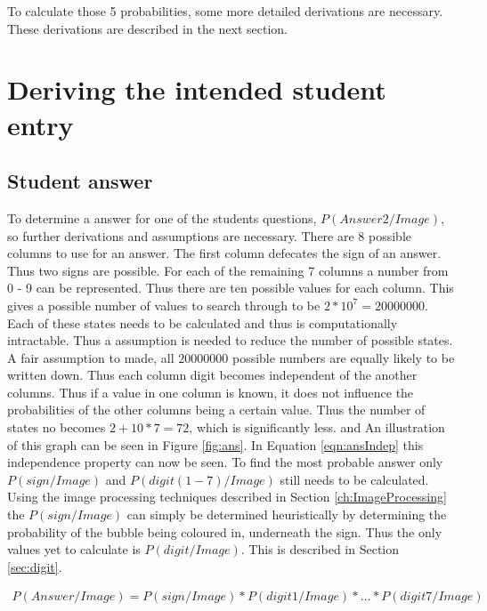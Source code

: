 To calculate those 5 probabilities, some more detailed derivations are necessary. These derivations are described in the next section.

\section{Deriving the intended student entry}

\subsection{Student answer}



To determine a answer for one of the students questions, $P(Answer2/Image)$, so further derivations and assumptions are necessary. There are 8 possible columns to use for an answer. The first column defecates the sign of an answer. Thus two signs are possible. For each of the remaining 7 columns a number from 0 - 9 can be represented. Thus there are ten possible values for each column. This gives a possible number of values to search through to be $2*10^7 = 20 000 000$. Each of these states needs to be calculated and thus is computationally intractable. Thus a assumption is needed to reduce the number of possible states. A fair assumption to made, all $20 000 000$ possible numbers are equally likely to be written down. Thus each column digit becomes independent of the another columns. Thus if a value in one column is known, it does not influence the probabilities of the other columns being a certain value. Thus the number of states no becomes $2+10*7=72$, which is significantly less. and An illustration of this graph can be seen in Figure \ref{fig:ans}. In Equation \ref{eqn:ansIndep} this independence property can now be seen. To find the most probable answer only $P(sign/Image)$ and $P(digit(1-7)/Image)$ still needs to be calculated. Using the image processing techniques described in Section \ref{ch:ImageProcessing} the $P(sign/Image)$ can simply be determined heuristically by determining the probability of the bubble being coloured in, underneath the sign. Thus the only values yet to calculate is $P(digit/Image)$. This is described in Section \ref{sec:digit}.

\begin{align}
  P(Answer/Image) =  P(sign/Image)*P(digit1/Image)*...*P(digit7/Image)
\label{eqn:ansIndep}
\end{align}

